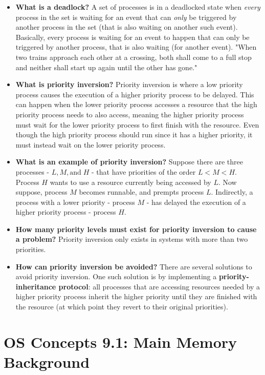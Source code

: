 \documentclass[12pt]{article}
\begin{document}
\begin{itemize}
    \item \textbf{What is a deadlock?} A set of processes is in a deadlocked state when \textit{every} process in the set is waiting for an event that can \textit{only} be triggered by another process in the set (that is also waiting on another such event). Basically, every process is waiting for an event to happen that can only be triggered by another process, that is also waiting (for another event). "When two trains approach each other at a crossing, both shall come to a full stop and neither shall start up again until the other has gone."
    \item \textbf{What is priority inversion?} Priority inversion is where a low priority process causes the execution of a higher priority process to be delayed. This can happen when the lower priority process accesses a resource that the high priority process needs to also access, meaning the higher priority process must wait for the lower priority process to first finish with the resource. Even though the high priority process should run since it has a higher priority, it must instead wait on the lower priority process.
    \item \textbf{What is an example of priority inversion?} Suppose there are three processes - \(L, M, \text{and} \; H\) - that have priorities of the order \(L < M < H\). Process \(H\) wants to use a resource currently being accessed by \(L\). Now suppose, process \(M\) becomes runnable, and prempts process \(L\). Indirectly, a process with a lower priority - process \(M\) - has delayed the execution of a higher priority process - process \(H\).
    \item \textbf{How many priority levels must exist for priority inversion to cause a problem?} Priority inversion only exists in systems with more than two priorities.
    \item \textbf{How can priority inversion be avoided?} There are several solutions to avoid priority inversion. One such solution is by implementing a \textbf{priority-inheritance protocol}: all processes that are accessing resources needed by a higher priority process inherit the higher priority until they are finished with the resource (at which point they revert to their original priorities).
\end{itemize}

\section*{OS Concepts 9.1: Main Memory Background}
\end{document}
